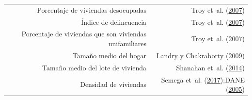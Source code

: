 \documentclass[12pt,a4paper,oneside, openany]{book}
\theoremstyle{definition}
\theoremstyle{definition}
\theoremstyle{definition}
\theoremstyle{remark}
\begin{document}
\begin{longtable}[]{@{}rr@{}}
\begin{minipage}[t]{0.57\columnwidth}\raggedleft\strut
Porcentaje de viviendas desocupadas\strut
\end{minipage} & \begin{minipage}[t]{0.31\columnwidth}\raggedleft\strut
Troy et~al. (\protect\hyperlink{ref-troy_predicting_2007}{2007})\strut
\end{minipage}\tabularnewline
\begin{minipage}[t]{0.57\columnwidth}\raggedleft\strut
Índice de delincuencia\strut
\end{minipage} & \begin{minipage}[t]{0.31\columnwidth}\raggedleft\strut
Troy et~al. (\protect\hyperlink{ref-troy_predicting_2007}{2007})\strut
\end{minipage}\tabularnewline
\begin{minipage}[t]{0.57\columnwidth}\raggedleft\strut
Porcentaje de viviendas que son viviendas unifamiliares\strut
\end{minipage} & \begin{minipage}[t]{0.31\columnwidth}\raggedleft\strut
Troy et~al. (\protect\hyperlink{ref-troy_predicting_2007}{2007})\strut
\end{minipage}\tabularnewline
\begin{minipage}[t]{0.57\columnwidth}\raggedleft\strut
Tamaño medio del hogar\strut
\end{minipage} & \begin{minipage}[t]{0.31\columnwidth}\raggedleft\strut
Landry y Chakraborty
(\protect\hyperlink{ref-landry_street_2009}{2009})\strut
\end{minipage}\tabularnewline
\begin{minipage}[t]{0.57\columnwidth}\raggedleft\strut
Tamaño medio del lote de vivienda\strut
\end{minipage} & \begin{minipage}[t]{0.31\columnwidth}\raggedleft\strut
Shanahan et~al.
(\protect\hyperlink{ref-shanahan_socio-economic_2014}{2014})\strut
\end{minipage}\tabularnewline
\begin{minipage}[t]{0.57\columnwidth}\raggedleft\strut
Densidad de viviendas\strut
\end{minipage} & \begin{minipage}[t]{0.31\columnwidth}\raggedleft\strut
Semega et~al. (\protect\hyperlink{ref-semega2017income}{2017});DANE
(\protect\hyperlink{ref-censo_sistema_dane}{2005})\strut
\end{minipage}\tabularnewline

\end{longtable}
\end{document}
